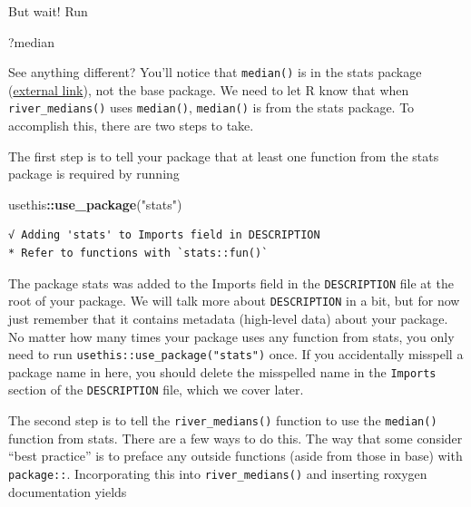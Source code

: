 \documentclass[
]{book}
\newenvironment{Shaded}{\begin{snugshade}}{\end{snugshade}}
\newcommand{\KeywordTok}[1]{\textcolor[rgb]{0.13,0.29,0.53}{\textbf{#1}}}
\newcommand{\NormalTok}[1]{#1}
\newcommand{\OperatorTok}[1]{\textcolor[rgb]{0.81,0.36,0.00}{\textbf{#1}}}
\newcommand{\StringTok}[1]{\textcolor[rgb]{0.31,0.60,0.02}{#1}}
\begin{document}
But wait! Run

\begin{Shaded}
\begin{Highlighting}[]
\NormalTok{?median}
\end{Highlighting}
\end{Shaded}

See anything different? You'll notice that \texttt{median()} is in the stats package (\href{https://stat.ethz.ch/R-manual/R-devel/library/stats/html/00Index.html}{external link}), not the base package. We need to let R know that when \texttt{river\_medians()} uses \texttt{median()}, \texttt{median()} is from the stats package. To accomplish this, there are two steps to take.

The first step is to tell your package that at least one function from the stats package is required by running

\begin{Shaded}
\begin{Highlighting}[]
\NormalTok{usethis}\OperatorTok{::}\KeywordTok{use_package}\NormalTok{(}\StringTok{"stats"}\NormalTok{)}
\end{Highlighting}
\end{Shaded}

\begin{verbatim}
√ Adding 'stats' to Imports field in DESCRIPTION
* Refer to functions with `stats::fun()`
\end{verbatim}

The package stats was added to the Imports field in the \texttt{DESCRIPTION} file at the root of your package. We will talk more about \texttt{DESCRIPTION} in a bit, but for now just remember that it contains metadata (high-level data) about your package. No matter how many times your package uses any function from stats, you only need to run \texttt{usethis::use\_package("stats")} once. If you accidentally misspell a package name in here, you should delete the misspelled name in the \texttt{Imports} section of the \texttt{DESCRIPTION} file, which we cover later.

The second step is to tell the \texttt{river\_medians()} function to use the \texttt{median()} function from stats. There are a few ways to do this. The way that some consider ``best practice'' is to preface any outside functions (aside from those in base) with \texttt{package::}. Incorporating this into \texttt{river\_medians()} and inserting roxygen documentation yields
\end{document}
